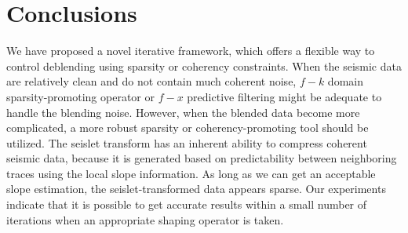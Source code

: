 \section{Conclusions}
We have proposed a novel iterative framework, which offers a flexible way to control deblending using sparsity or coherency constraints.  
When the seismic data are relatively clean and do not contain much coherent noise, $f-k$ domain sparsity-promoting operator or $f-x$ predictive filtering might be adequate to handle the blending noise. However, when the blended data become more complicated, a more robust sparsity or coherency-promoting tool should be utilized. The seislet transform has an inherent ability to compress coherent seismic data, because it is generated based on predictability between neighboring traces using the local slope information. As long as we can get an acceptable slope estimation, the seislet-transformed data appears sparse.
Our experiments indicate that it is possible to get accurate results within a small number of iterations when an appropriate shaping operator is taken. 

